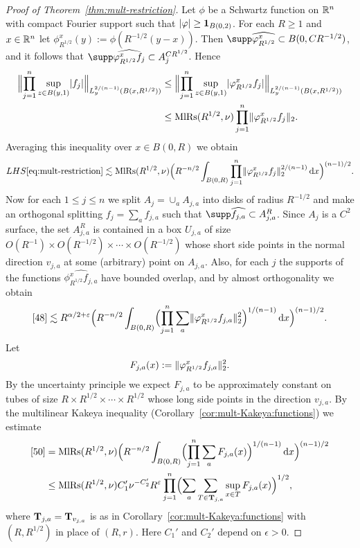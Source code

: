 \begin{proof}[Proof of Theorem~\ref{thm:mult-restriction}]
Let $\phi$ be a Schwartz function on $\R^{n}$ with compact Fourier support such that $\abs{\phi} \geq \one_{B(0,2)}$.
For each $R\geq 1$ and $x\in\R^n$ let $\phi_{R^{1/2}}^{x}(y) := \phi(R^{-1/2}(y-x))$.
Then $\supp \widehat{\phi_{R^{1/2}}^{x}} \subset B(0,CR^{-1/2})$, and it follows that $\supp \widehat{\phi_{R^{1/2}}^{x} f_{j}} \subset A_{j}^{C R^{1/2}}$.
Hence
\begin{align*}
\norm[\Big]{\prod_{j=1}^{n} \sup_{z\in B(y,1)}\abs{f_{j}} }_{L^{2/(n-1)}_{y}(B(x,R^{1/2}))}
&\leq
\norm[\Big]{\prod_{j=1}^{n} \sup_{z\in B(y,1)} \abs{\phi_{R^{1/2}}^{x} f_{j}} }_{L^{2/(n-1)}_{y}(B(x,R^{1/2}))}\\
&\leq
\MlRs(R^{1/2},\nu)
\prod_{j=1}^{n}\norm{\phi_{R^{1/2}}^{x} f_{j}}_{2}.
\end{align*}
Averaging this inequality over $x \in B(0,R)$ we obtain
\begin{equation}\label{48}
LHS\eqref{eq:mult-restriction}
\lesssim
\MlRs(R^{1/2},\nu)
\Bigl( R^{-n/2} \int_{B(0,R)} \prod_{j=1}^{n}
\norm{\phi_{R^{1/2}}^{x} f_{j}}_{2}^{2/(n-1)} \dif x \Bigr)^{(n-1)/2}.
\end{equation}
Now for each $1\leq j\leq n$ we split $A_{j} = \cup_{a} A_{j,a}$ into disks of radius $R^{-1/2}$ and make an orthogonal splitting $f_{j} = \sum_{a} f_{j,a}$ such that $\supp \widehat{f_{j,a}} \subset A_{j,a}^{R}$.
Since $A_{j}$ is a $C^{2}$ surface, the set $A_{j,a}^{R}$ is contained in a box $U_{j,a}$ of size $O(R^{-1}) \times O(R^{-1/2}) \times \dotsb \times O(R^{-1/2})$ whose short side points in the normal direction $v_{j,a}$ at some (arbitrary) point on $A_{j,a}$.
Also, for each $j$ the supports of the functions $\widehat{\phi_{R^{1/2}}^{x} f_{j,a}}$ have bounded overlap, and by almost orthogonality we obtain
\begin{equation}\label{50}
\eqref{48} \lesssim
R^{\alpha/2+\epsilon}
\Bigl( R^{-n/2} \int_{B(0,R)} \Bigl(\prod_{j=1}^{n} \sum_{a} \norm{\phi_{R^{1/2}}^{x} f_{j,a}}_{2}^{2} \Bigr)^{1/(n-1)} \dif x \Bigr)^{(n-1)/2}.
\end{equation}
Let
\[
F_{j,a}(x) := \norm{\phi_{R^{1/2}}^{x} f_{j,a}}_{2}^{2}.
\]
By the uncertainty principle we expect $F_{j,a}$ to be approximately constant on tubes of size $R\times R^{1/2}\times \cdots\times R^{1/2}$ whose long side points in the direction $v_{j,a}$.
By the multilinear Kakeya inequality (Corollary~\ref{cor:mult-Kakeya:functions}) we estimate
\begin{align*}
\eqref{50}
&=
\MlRs(R^{1/2},\nu) \Bigl( R^{-n/2} \int_{B(0,R)} \Bigl(\prod_{j=1}^{n} \sum_{a} F_{j,a}(x) \Bigr)^{1/(n-1)} \dif x \Bigr)^{(n-1)/2}\\
&\leq
\MlRs(R^{1/2},\nu) C_{1}' \nu^{-C_{2}'} R^{\epsilon}
\prod_{j=1}^{n} \Bigl( \sum_{a} \sum_{T \in \Tubes_{j,a}} \sup_{x \in T} F_{j,a}(x) \Bigr)^{1/2},
\end{align*}
where $\Tubes_{j,a} = \Tubes_{v_{j,a}}$ is as in Corollary~\ref{cor:mult-Kakeya:functions} with $(R,R^{1/2})$ in place of $(R,r)$.
Here $C_{1}'$ and $C_{2}'$ depend on $\epsilon>0$.


\end{proof}
